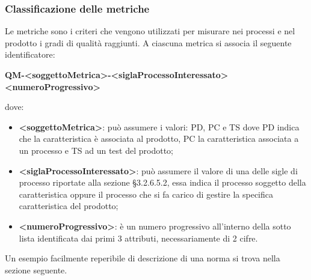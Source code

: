 		\subsubsection{Classificazione delle metriche}
			Le metriche sono i criteri che vengono utilizzati per misurare nei processi e nel prodotto i gradi di qualità raggiunti. A ciascuna metrica si associa il seguente identificatore:
			\begin{center}
				\textbf{QM-<soggettoMetrica>-<siglaProcessoInteressato><numeroProgressivo>}
			\end{center}
			dove:
			\begin{itemize}
				\item\textbf{<soggettoMetrica>}: può assumere i valori: PD, PC e TS dove PD indica che la caratteristica è associata al prodotto,  PC la caratteristica associata a un processo e TS ad un test del prodotto;
				\item\textbf{<siglaProcessoInteressato>}: può assumere il valore di una delle sigle di processo riportate alla sezione §3.2.6.5.2, essa indica il processo soggetto della caratteristica oppure il processo che si fa carico di gestire la specifica caratteristica del prodotto;
				\item\textbf{<numeroProgressivo>}: è un numero progressivo all’interno della sotto lista identificata dai primi 3 attributi, necessariamente di 2 cifre.
			\end{itemize}
			Un esempio facilmente reperibile di descrizione di una norma si trova nella sezione seguente.
